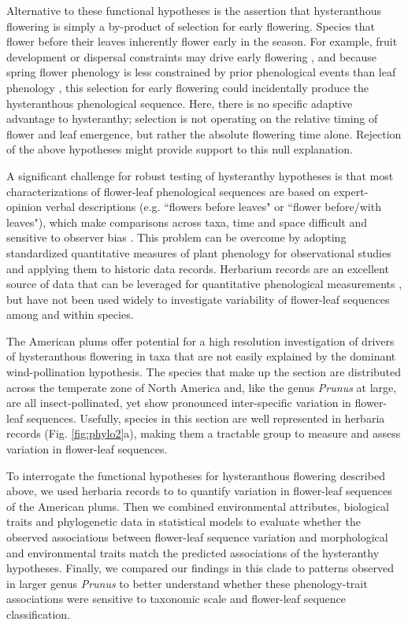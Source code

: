 \documentclass{article}[12pt]
\begin{document}
Alternative to these functional hypotheses is the assertion that hysteranthous flowering is simply a by-product of selection for early flowering. Species that flower before their leaves inherently flower early in the season. For example, fruit development or dispersal constraints may drive early flowering \citep{Primack1987}, and because spring flower phenology is less constrained by prior phenological events than leaf phenology \citep{Savage2019,Ettinger2018}, this selection for early flowering could incidentally produce the hysteranthous phenological sequence. Here, there is no specific adaptive advantage to hysteranthy;  selection is not operating on the relative timing of flower and leaf emergence, but rather the absolute flowering time alone. Rejection of the above hypotheses might provide support to this null explanation. 

\noindent A significant challenge for robust testing of hysteranthy hypotheses is that most characterizations of flower-leaf phenological sequences are based on expert-opinion verbal descriptions (e.g. ``flowers before leaves" or ``flower before/with leaves"), which make comparisons across taxa, time and space difficult and sensitive to observer bias  \citep[see;][]{Buonaiuto2020}. This problem can be overcome by adopting standardized quantitative measures of plant phenology for observational studies and applying them to historic data records. Herbarium records are an excellent source of data that can be leveraged for quantitative phenological measurements \citep{Willis2017}, but have not been used widely to investigate variability of flower-leaf sequences among and within species.

\noindent The American plums offer potential for a high resolution investigation of drivers of hysteranthous flowering in taxa that are not easily explained by the dominant wind-pollination hypothesis. The species that make up the section are distributed across the temperate zone of North America and, like the genus \textit{Prunus} at large, are all insect-pollinated, yet show pronounced inter-specific variation in flower-leaf sequences. Usefully, species in this section are well represented in herbaria records (Fig. \ref{fig:phylo2}a), making them a tractable group to measure and assess variation in flower-leaf sequences.

\noindent To interrogate the functional hypotheses for hysteranthous flowering described above, we used herbaria records to to quantify variation in flower-leaf sequences of the American plums. Then we combined environmental attributes, biological traits and phylogenetic data in statistical models to evaluate whether the observed associations between flower-leaf sequence variation and morphological and environmental traits match the predicted associations of the hysteranthy hypotheses. Finally, we compared our findings in this clade to patterns observed in larger genus \emph{Prunus} to better understand whether these phenology-trait associations were sensitive to taxonomic scale and flower-leaf sequence classification.
\end{document}
